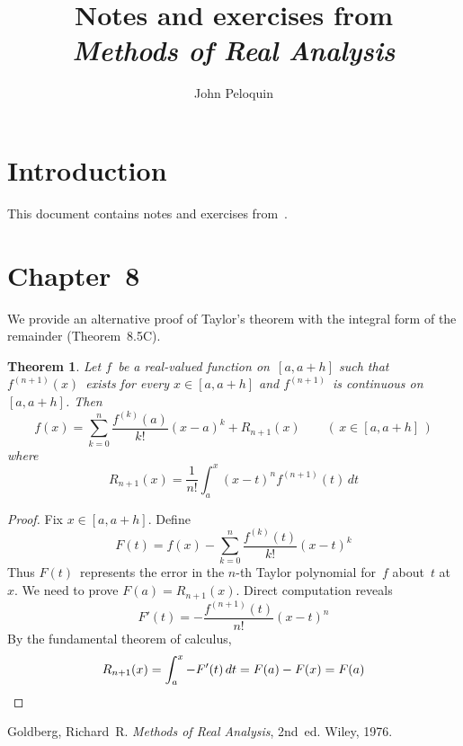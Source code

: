 \documentclass[letterpaper,12pt]{article}
\title{Notes and exercises from\\\textit{Methods of Real Analysis}}
\author{John Peloquin}
\date{}
\theoremstyle{plain}
\newtheorem*{thm}{Theorem}
\theoremstyle{definition}
\theoremstyle{remark}
\begin{document}
\maketitle

\section*{Introduction}
This document contains notes and exercises from~\cite{goldberg}.

\section*{Chapter~8}
We provide an alternative proof of Taylor's theorem with the integral form of the remainder (Theorem~8.5C).
\begin{thm}
Let \(f\)~be a real-valued function on~\([a,a+h]\) such that \(f^{(n+1)}(x)\)~exists for every \(x\in[a,a+h]\) and \(f^{(n+1)}\)~is continuous on~\([a,a+h]\). Then
\[f(x)=\sum_{k=0}^n\frac{f^{(k)}(a)}{k!}(x-a)^k+R_{n+1}(x)\qquad(\,x\in[a,a+h]\,)\]
where
\[R_{n+1}(x)=\frac{1}{n!}\int_a^x(x-t)^nf^{(n+1)}(t)\,dt\]
\end{thm}
\begin{proof}
Fix \(x\in[a,a+h]\). Define
\[F(t)=f(x)-\sum_{k=0}^n\frac{f^{(k)}(t)}{k!}(x-t)^k\]
Thus \(F(t)\)~represents the error in the \(n\)-th Taylor polynomial for~\(f\) about~\(t\) at~\(x\). We need to prove \(F(a)=R_{n+1}(x)\). Direct computation reveals
\[F'(t)=-\frac{f^{(n+1)}(t)}{n!}(x-t)^n\]
By the fundamental theorem of calculus,
\[R_{n+1}(x)=\int_a^x-F'(t)\,dt=F(a)-F(x)=F(a)\qedhere\]
\end{proof}

\begin{thebibliography}{0}
 Goldberg, Richard~R. \textit{Methods of Real Analysis}, 2nd~ed. Wiley, 1976.
\end{thebibliography}
\end{document}
